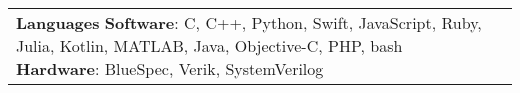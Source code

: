 \documentclass{resume}
\begin{document}
\begin{minipage}[t][0pt]{\linewidth}
\begin{center}
\begin{tabularx}{\linewidth}{ p{6cm} X  }
{{            \vspace{\skillSpacing}
        
            \textbf{Languages} \newline
            {\footnotesize \textbf{Software}: C, C++, Python, Swift, JavaScript, Ruby, Julia, Kotlin, MATLAB, Java, Objective-C, PHP, bash\newline
            \textbf{Hardware}: BlueSpec, Verik, SystemVerilog
            }{}{}
            
            
    }

    \vspace{-200px}
    
} 
& 
{

}
\end{tabularx}
\end{center}
\end{minipage}
\end{document}
